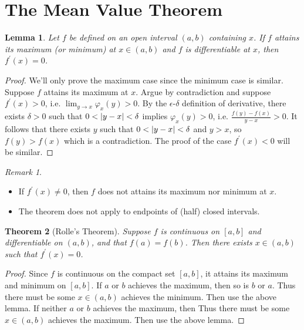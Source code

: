 \documentclass[12pt, lettersize]{book}
\theoremstyle{plain}
\newtheorem{thm}{Theorem}[section]
\newtheorem{lem}[thm]{Lemma}
\theoremstyle{definition}
\theoremstyle{remark}
\newtheorem*{rem}{Remark}
\begin{document}
		\section{The Mean Value Theorem}
			\begin{lem}
			Let $f$ be defined on an open interval $(a,b)$ containing $x$. If $f$ attains its maximum (or minimum) at $x\in(a,b)$ and $f$ is differentiable at $x$, then $f^\prime(x)=0$.
			\end{lem}
			\begin{proof}
			We'll only prove the maximum case since the minimum case is similar. Suppose $f$ attains its maximum at $x$. Argue by contradiction and suppose $f^\prime(x)>0$, i.e. $\lim_{y\rightarrow x}\varphi_x(y)>0$. By the $\epsilon$-$\delta$ definition of derivative, there exists $\delta>0$ such that $0<\abs{y-x}<\delta$ implies $\varphi_x(y)>0$, i.e. $\frac{f(y)-f(x)}{y-x}>0$. It follows that there exists $y$ such that $0<\abs{y-x}<\delta$ and $y>x$, so $f(y)>f(x)$ which is a contradiction. The proof of the case $f^\prime(x)<0$ will be similar. 
			\end{proof}
			\begin{rem}
			\begin{itemize}
				\item If $f^\prime(x)\neq0$, then $f$ does not attains its maximum nor minimum at $x$.
				\item The theorem does not apply to endpoints of (half) closed intervals.
			\end{itemize}
			\end{rem}
			
			\begin{thm}[Rolle's Theorem]\label{thm:29.2, Rolle}
			Suppose $f$ is continuous on $[a,b]$ and differentiable on $(a,b)$, and that $f(a)=f(b)$. Then there exists $x\in(a,b)$ such that $f^\prime(x)=0$.
			\end{thm}
			\begin{proof}
				Since $f$ is continuous on the compact set $[a,b]$, it attains its maximum and minimum on $[a,b]$. If $a$ or $b$ achieves the maximum, then so is $b$ or $a$. Thus there must be some $x\in(a,b)$ achieves the minimum. Then use the above lemma. If neither $a$ or $b$ achieves the maximum, then Thus there must be some $x\in(a,b)$ achieves the maximum. Then use the above lemma.
			\end{proof}
			
\end{document}
